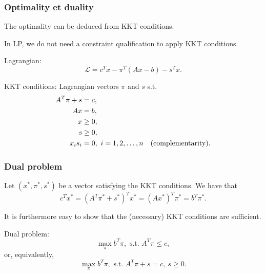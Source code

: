 \documentclass{beamer}
\begin{document}
\begin{frame}
\frametitle{Optimality et duality}

The optimality can be deduced from KKT conditions.

\mbox{}

In LP, we do not need a constraint qualification to apply KKT conditions.

\mbox{}

Lagrangian:
\[
\mathcal{L} = c^Tx - \pi^T(Ax-b) - s^Tx.
\]

KKT conditions: Lagrangian vectors $\pi$ and $s$ s.t.
\begin{align*}
A^T\pi + s &= c,\\
Ax &= b,\\
x &\geq 0,\\
s &\geq 0,\\
x_is_i &= 0,\ i=1,2,\ldots,n \quad \rm{(complementarity)}.
\end{align*}

\end{frame}

\begin{frame}
\frametitle{Dual problem}

Let $(x^*, \pi^*, s^*)$ be a vector satisfying the KKT conditions. We have that
\[
c^Tx^* = (A^T\pi^*+s^*)^Tx^* = (Ax^*)^T\pi^* = b^T\pi^*.
\]

It is furthermore easy to show that the (necessary) KKT conditions are sufficient.

\mbox{}

{\red Dual problem}:
\[
\max_\pi b^T\pi, \mbox{ s.t. } A^T\pi \leq c,
\]
or, equivalently,
\[
\max_\pi b^T\pi, \mbox{ s.t. } A^T\pi +s = c,\ s \geq 0.
\]

\end{frame}
\end{document}
